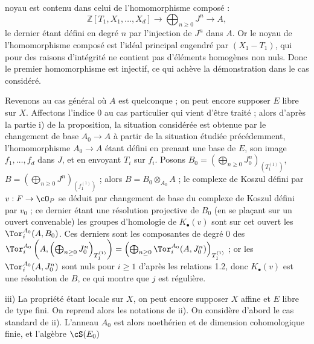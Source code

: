 noyau est contenu dans celui de l'homomorphisme composé :
\[
\mathbb Z[T_1,X_1,\ldots,X_d]\longrightarrow
\bigoplus_{n\ge0}J^n\longrightarrow A,
\]
le dernier étant défini en degré \(n\) par l'injection de \(J^n\) dans \(A\). Or le noyau de l'homomorphisme composé est l'idéal principal engendré par \((X_1-T_1)\), qui pour des raisons d'intégrité ne contient pas d'éléments homogènes non nuls. Donc le premier homomorphisme est injectif, ce qui achève la démonstration dans le cas considéré.

Revenons au cas général où \(A\) est quelconque ; on peut encore supposer \(E\) libre sur \(X\). Affectons l'indice \(0\) au cas particulier qui vient d'être traité ; alors d'après la partie i) de la proposition, la situation considérée est obtenue par le changement de base \(A_0\to A\) à partir de la situation étudiée précédemment, l'homomorphisme \(A_0\to A\) étant défini en prenant une base de \(E\), son image \(f_1,\ldots,f_d\) dans \(J\), et en envoyant \(T_i\) sur \(f_i\). Posons \(B_0=\left(\bigoplus_{n\ge0}J_0^n\right)_{(T_1^{(1)})}\), \(B=\left(\bigoplus_{n\ge0}J^n\right)_{(f_1^{(1)})}\) ; alors \(B=B_0\otimes_{A_0}A\) ; le complexe de Koszul défini par \(v:F\to\cO_P\) se déduit par changement de base du complexe de Koszul défini par \(v_0\) ; ce dernier étant une résolution projective de \(B_0\) (en se plaçant sur un ouvert convenable) les groupes d'homologie de \(K_\bullet(v)\) sont sur cet ouvert les \(\Tor_i^{A_0}(A,B_0)\). Ces derniers sont les composantes de degré \(0\) des \(\Tor_i^{A_0}\left(A,\left(\bigoplus_{n\ge0}J_0^n\right)_{T_1^{(1)}}\right)=\left(\bigoplus_{n\ge0}\Tor_i^{A_0}(A,J_0^n)\right)_{T_1^{(1)}}\) ; or les \(\Tor_i^{A_0}(A,J_0^n)\) sont nuls pour \(i\ge1\) d'après les relations 1.2, donc \(K_\bullet(v)\) est une résolution de \(B\), ce qui montre que \(j\) est régulière.

iii) La propriété étant locale sur \(X\), on peut encore supposer \(X\) affine et \(E\) libre de type fini. On reprend alors les notations de ii). On considère d'abord le cas standard de ii). L'anneau \(A_0\) est alors noethérien et de dimension cohomologique finie, et l'algèbre \(\cS(E_0)\)
